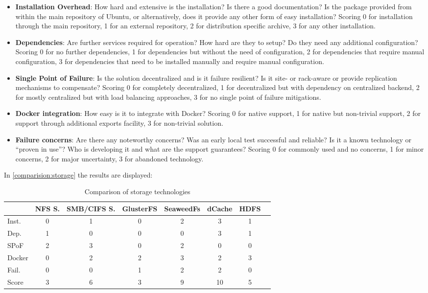 \begin{itemize}
\item \textbf{Installation Overhead}:
How hard and extensive is the installation?
Is there a good documentation?
Is the package provided from within the main repository of Ubuntu, or alternatively, does it provide any other form of easy installation?
Scoring 0 for installation through the main repository, 1 for an external repository, 2 for distribution specific archive, 3 for any other installation.

\item \textbf{Dependencies}:
Are further services required for operation? 
How hard are they to setup?
Do they need any additional configuration?
Scoring 0 for no further dependencies, 1 for dependencies but without the need of configuration,  2 for dependencies that require manual configuration, 3 for dependencies that need to be installed manually and require manual configuration.

\item \textbf{Single Point of Failure}:
Is the solution decentralized and is it failure resilient?
Is it site- or rack-aware or provide replication mechanisms to compensate?
Scoring 0 for completely decentralized, 1 for decentralized but with dependency on centralized backend, 2 for mostly centralized but with load balancing approaches, 3 for no single point of failure mitigations.

\item \textbf{Docker integration}:
How easy is it to integrate with Docker?
Scoring 0 for native support, 1 for native but non-trivial support, 2 for support through additional exports facility, 3 for non-trivial solution.

\item \textbf{Failure concerns}:
Are there any noteworthy concerns?
Was an early local test successful and reliable?
Is it a known technology or \enquote{proven in use}?
Who is developing it and what are the support guarantees?
Scoring 0 for commonly used and no concerns, 1 for minor concerns, 2 for major uncertainty, 3 for abandoned technology.
\end{itemize}

In \autoref{comparision:storage} the results are displayed:

\begin{table}[H]
	\begin{tabular}{l|c|c|c|c|c|c|c}
				& NFS S.& SMB/CIFS S.& GlusterFS & SeaweedFs	& dCache 	& HDFS \\
		\hline
		Inst. 	& 0 	& 1 		& 0 		& 2 		& 3			& 1 \\
		Dep. 	& 1 	& 0			& 0 		& 0 		& 3 		& 1 \\
		SPoF 	& 2		& 3			& 0			& 2 		& 0			& 0 \\
		Docker 	& 0 	& 2 		& 2 		& 3 		& 2 		& 3 \\
		Fail.	& 0		& 0			& 1			& 2			& 2			& 0 \\
		\hline
		Score 	& 3		& 6			& 3			& 9			& 10		& 5 \\
	\end{tabular}
	\caption{Comparison of storage technologies}
	\label{comparision:storage}
\end{table}

